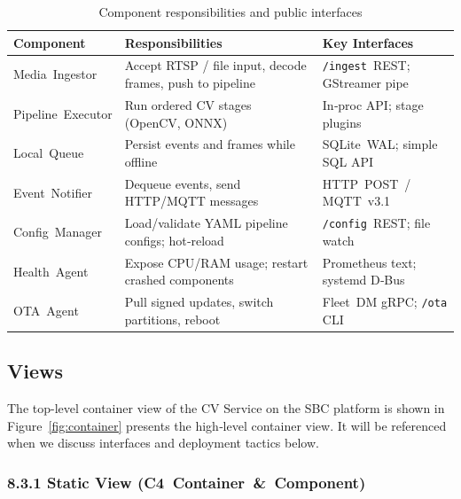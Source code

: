 \documentclass[11pt,a4paper]{article}
\begin{document}
\begin{table}[h!]
\centering
\setlength{\extrarowheight}{2pt}
\begin{tabular}{|p{3cm}|p{5.5cm}|p{4.5cm}|}
\hline
\textbf{Component} & \textbf{Responsibilities} & \textbf{Key Interfaces} \\ \hline
Media Ingestor & Accept RTSP / file input, decode frames, push to pipeline & \texttt{/ingest} REST; GStreamer pipe \\ \hline
Pipeline Executor & Run ordered CV stages (OpenCV, ONNX) & In‑proc API; stage plugins \\ \hline
Local Queue & Persist events and frames while offline & SQLite WAL; simple SQL API \\ \hline
Event Notifier & Dequeue events, send HTTP/MQTT messages & HTTP POST / MQTT v3.1 \\ \hline
Config Manager & Load/validate YAML pipeline configs; hot‑reload & \texttt{/config} REST; file watch \\ \hline
Health Agent & Expose CPU/RAM usage; restart crashed components & Prometheus text; systemd D‑Bus \\ \hline
OTA Agent & Pull signed updates, switch partitions, reboot & Fleet DM gRPC; \texttt{/ota} CLI \\ \hline
\end{tabular}
\caption{Component responsibilities and public interfaces}
\label{tab:component_catalog}
\end{table}

\subsection{Views}
The top-level container view of the CV Service on the SBC platform is shown in 
Figure~\ref{fig:container} presents the high‑level container view.  
It will be referenced when we discuss interfaces and deployment tactics below.

\subsubsection*{8.3.1 Static View (C4 Container \& Component)}
\end{document}
